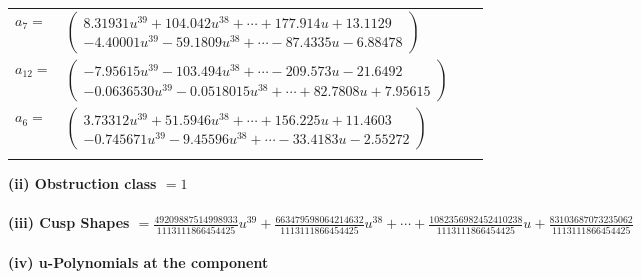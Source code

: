 \documentclass[1p]{elsarticle_modified}
\theoremstyle{definition}
\begin{document}
\begin{tabular}{m{7pt} m{180pt} m{7pt} m{180pt} }
\flushright $a_{7}=$&$\begin{pmatrix}8.31931 u^{39}+104.042 u^{38}+\cdots+177.914 u+13.1129\\-4.40001 u^{39}-59.1809 u^{38}+\cdots-87.4335 u-6.88478\end{pmatrix}$ \\
\flushright $a_{12}=$&$\begin{pmatrix}-7.95615 u^{39}-103.494 u^{38}+\cdots-209.573 u-21.6492\\-0.0636530 u^{39}-0.0518015 u^{38}+\cdots+82.7808 u+7.95615\end{pmatrix}$ \\
\flushright $a_{6}=$&$\begin{pmatrix}3.73312 u^{39}+51.5946 u^{38}+\cdots+156.225 u+11.4603\\-0.745671 u^{39}-9.45596 u^{38}+\cdots-33.4183 u-2.55272\end{pmatrix}$\\&\end{tabular}
\flushleft \textbf{(ii) Obstruction class $= 1$}\\~\\
\flushleft \textbf{(iii) Cusp Shapes $= \frac{49209887514998933}{1113111866454425} u^{39}+\frac{663479598064214632}{1113111866454425} u^{38}+\cdots+\frac{1082356982452410238}{1113111866454425} u+\frac{83103687073235062}{1113111866454425}$}\\~\\
\newpage\renewcommand{\arraystretch}{1}
\flushleft \textbf{(iv) u-Polynomials at the component}\newline \\
\end{document}
